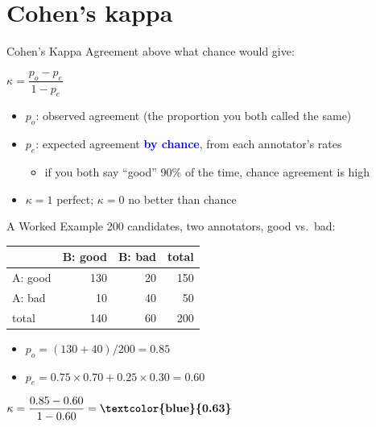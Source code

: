 \documentclass[xetex,aspectratio=169]{beamer}
\newcommand{\txx}[1]{\textbf{\textcolor{blue}{#1}}}
\begin{document}
\section{Cohen's kappa}

\begin{frame}{Cohen's Kappa}
  Agreement above what chance would give:
  \begin{block}{}
    \centering\large
    $\kappa = \dfrac{p_o - p_e}{1 - p_e}$
  \end{block}
  \begin{itemize}
  \item $p_o$: observed agreement (the proportion you both called the same)
  \item $p_e$: expected agreement \txx{by chance}, from each annotator's rates
    \begin{itemize}
    \item if you both say ``good'' 90\% of the time, chance agreement is high
    \end{itemize}
  \item $\kappa = 1$ perfect; $\kappa = 0$ no better than chance
  \end{itemize}
\end{frame}

\begin{frame}{A Worked Example}
  200 candidates, two annotators, good vs.\ bad:
  \begin{center}
  \begin{tabular}{lrrr}
    \toprule
    & B: good & B: bad & total \\
    \midrule
    A: good & 130 & 20 & 150 \\
    A: bad  &  10 & 40 &  50 \\
    \midrule
    total   & 140 & 60 & 200 \\
    \bottomrule
  \end{tabular}
  \end{center}
  \begin{itemize}
  \item $p_o = (130+40)/200 = 0.85$
  \item $p_e = 0.75\!\times\!0.70 + 0.25\!\times\!0.30 = 0.60$
  \end{itemize}
  \begin{block}{}
    \centering $\kappa = \dfrac{0.85 - 0.60}{1 - 0.60} = \txx{0.63}$
  \end{block}
\end{frame}
\end{document}
